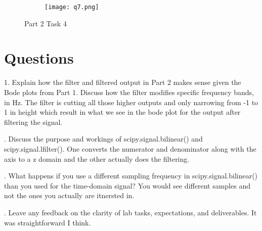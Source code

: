 \documentclass[12pt,a4paper]{article}
\begin{document}
\begin{figure}[h]
\centering
\begin{subfigure}{ 1\textwidth}
\texttt{[image: q7.png]}
\end{subfigure}
\caption{ Part 2 Task 4 }
\label{fig2:image22}
\end{figure}

\clearpage

\section{Questions}\label{sec:res}


1. Explain how the filter and filtered output in Part 2 makes sense given the Bode plots from
Part 1. Discuss how the filter modifies specific frequency bands, in Hz.
\newline The filter is cutting all those higher outputs and only narrowing from -1 to 1 in height which result in what we see in the bode plot for the output after filtering the signal.


. Discuss the purpose and workings of
scipy.signal.bilinear() and scipy.signal.lfilter().
\newline
\noindent One converts the numerator and denominator along with the axis to a z domain and the other actually does the filtering.



. What happens if you use a different sampling frequency in scipy.signal.bilinear() than
you used for the time-domain signal?
\newline
\noindent You would see different samples and not the ones you actually are itnersted in.

. Leave any feedback on the clarity of lab tasks, expectations, and deliverables.\newline
\noindent It was straightforward I think.



\end{document}
